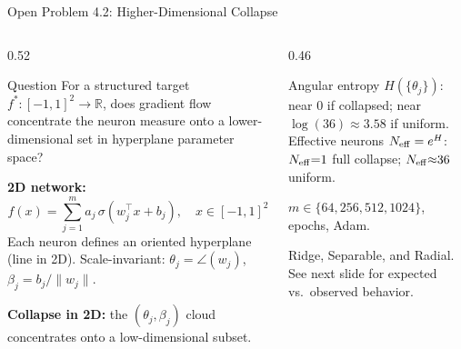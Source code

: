 \documentclass[aspectratio=169, 10pt]{beamer}
\newcommand{\fstar}{f^\ast}
\begin{document}
\begin{frame}{Open Problem 4.2: Higher-Dimensional Collapse}
  \begin{columns}[T]
    \begin{column}{0.52\textwidth}
      \begin{block}{Question}
        For a structured target $\fstar : [-1,1]^2 \to \mathbb{R}$,
        does gradient flow concentrate the neuron measure onto
        a lower-dimensional set in hyperplane parameter space?
      \end{block}

      \vspace{0.3em}
      \small
      \textbf{2D network:}
      \[
        f(x) = \sum_{j=1}^{m} a_j\,\sigma(w_j^\top x + b_j),
        \quad x \in [-1,1]^2
      \]
      Each neuron defines an oriented hyperplane (line in 2D).
      Scale-invariant: $\theta_j = \angle(w_j)$,\; $\beta_j = b_j / \|w_j\|$.

      \vspace{0.2em}
      \textbf{Collapse in 2D:} the $(\theta_j, \beta_j)$ cloud
      concentrates onto a low-dimensional subset.
    \end{column}
    \begin{column}{0.46\textwidth}
      \begin{tcolorbox}[slideboxB, title={Diagnostic}]
        \small
        Angular entropy $H(\{\theta_j\})$: near 0 if collapsed;
        near $\log(36) \approx 3.58$ if uniform.
        \vspace{3pt}
        Effective neurons $N_{\rm eff} = e^H$:\\
        $N_{\rm eff}{=}1$ full collapse;\; $N_{\rm eff}{\approx}36$ uniform.
      \end{tcolorbox}
      \vspace{0.3em}
      \begin{tcolorbox}[slideboxA, title={Width sweep}]
        \small
        $m \in \{64, 256, 512, 1024\}$, epochs, Adam.
      \end{tcolorbox}
      \vspace{0.3em}
      \begin{tcolorbox}[slideboxA, title={Three targets studied}]
        \small
        Ridge, Separable, and Radial.\\
        See next slide for expected vs.\ observed behavior.
      \end{tcolorbox}
    \end{column}
  \end{columns}
\end{frame}
\end{document}
